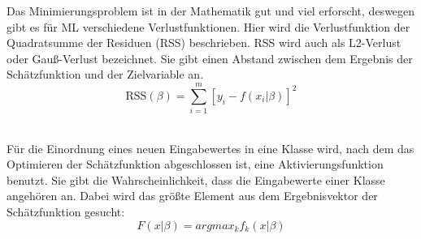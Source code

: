 Das Minimierungsproblem ist in der Mathematik gut und viel erforscht, deswegen gibt es für ML verschiedene Verlustfunktionen.  
Hier wird die Verlustfunktion der Quadratsumme der Residuen (RSS) beschrieben.  RSS wird auch als L2-Verlust oder Gauß-Verlust bezeichnet. Sie gibt einen Abstand zwischen dem Ergebnis der Schätzfunktion und der Zielvariable an.  \\
\begin{equation}
\text{RSS}(\beta) = \sum_{i= 1}^{m} [y_{i} - f(x_{i}|\beta)]^{2}
\end{equation}\\

Für die Einordnung eines neuen Eingabewertes in eine Klasse wird,  nach dem  das Optimieren der Schätzfunktion abgeschlossen ist,  eine Aktivierungsfunktion benutzt.  Sie gibt die Wahrscheinlichkeit,  dass die Eingabewerte einer Klasse angehören an.  Dabei wird das größte Element aus dem Ergebnisvektor der Schätzfunktion gesucht:
\begin{equation}
F(x|\beta) = argmax_{k} f_{k}(x|\beta)
\end{equation}

